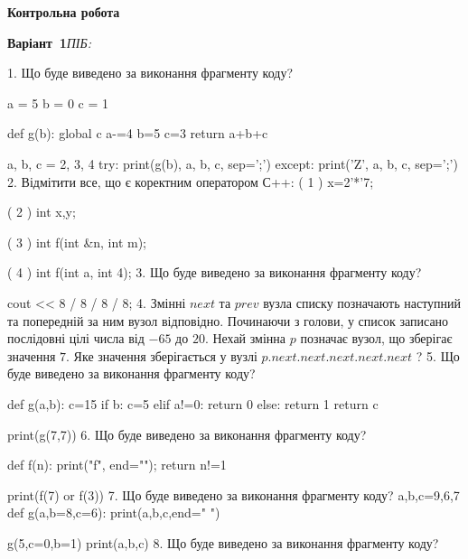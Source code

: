 \documentclass[11pt]{article}
\begin{document}
{\large\textbf{Контрольна робота}}

\textbf{Варіант \No\,1}\hfill \textit{ПІБ:}\,\underline{\hspace{60mm}}
\vspace{4mm}

1. Що буде виведено за виконання фрагменту коду?

a = 5
b = 0
c = 1

def g(b):
global c    a-=4
    b=5
    c=3
    return a+b+c

a, b, c = 2, 3, 4
try:
    print(g(b), a, b, c, sep=';')
except:
    print('Z', a, b, c, sep=';')
\vspace{5mm}
2. %
Відмітити все, що є коректним оператором С++:
( 1 ) x=2'*'7;

( 2 ) {int x,y;}

( 3 ) int f(int &n, int m);

( 4 ) int f(int a, int 4);
\vspace{5mm}
3. Що буде виведено за виконання фрагменту коду?

cout << 8 / 8 / 8 / 8;
\vspace{5mm}
4. 
Змінні $next$ та $prev$ вузла списку позначають наступний та попередній за ним вузол відповідно. Починаючи з голови, у список записано послідовні цілі числа від $-65$ до $20$. Нехай змінна $p$ позначає вузол, що зберігає значення $7$.
Яке значення зберігається у вузлі $p.next.next.next.next.next$ ?
\vspace{5mm}
5. Що буде виведено за виконання фрагменту коду?

def g(a,b):
    c=15
    if b:
        c=5
    elif a!=0:
         return 0
    else: 
        return 1
    return c

print(g(7,7))
\vspace{5mm}
6. Що буде виведено за виконання фрагменту коду?

def f(n):
    print("f", end="");
    return n!=1

print(f(7) or f(3))
\vspace{5mm}
7. Що буде виведено за виконання фрагменту коду?
a,b,c=9,6,7
def g(a,b=8,c=6):
    print(a,b,c,end=" ")

g(5,c=0,b=1)
print(a,b,c)
\vspace{5mm}
8. Що буде виведено за виконання фрагменту коду?
\end{document}
